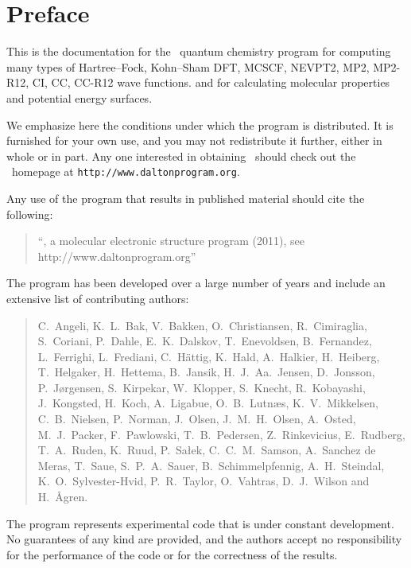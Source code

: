 \tableofcontents

\chapter*{Preface}

This is the documentation for the \dalton\ quantum chemistry program 
for computing many types of Hartree--Fock, Kohn--Sham DFT, 
MCSCF, NEVPT2, MP2, MP2-R12, CI, CC, CC-R12 wave functions.
and for calculating molecular properties and potential energy surfaces.

          We emphasize here the conditions under which the
program is distributed.  It is furnished for your own use,
and you may not redistribute it further, either in whole or in
part.  Any one interested in obtaining \dalton\ should check out the
\dalton\ homepage at
\verb|http://www.daltonprogram.org|.

Any use of the program that results in published
material should cite the following:
\begin{quote}
``\dalton , a molecular electronic  structure program
(2011), see http://www.daltonprogram.org''
\end{quote}

The program has been developed over a large number of years and
include an extensive list of contributing authors:

\begin{quote}\raggedright
C.~Angeli,
K.~L.~Bak,
V.~Bakken,
O.~Christiansen,
R.~Cimiraglia,
S.~Coriani,
P.~Dahle,
E.~K.~Dalskov,
T.~Enevoldsen,
B.~Fernandez,
L.~Ferrighi,
L.~Frediani,
C.~H{\"a}ttig,
K.~Hald,
A.~Halkier,
H.~Heiberg,
T.~Helgaker,
H.~Hettema,
B.~Jansik,
H.~J.~Aa.~Jensen,
D.~Jonsson,
P.~J{\o}rgensen,
S.~Kirpekar,
W.~Klopper,
S.~Knecht,
R.~Kobayashi,
J.~Kongsted,
H.~Koch,
A.~Ligabue,
O.~B.~Lutn\ae s,
K.~V.~Mikkelsen,
C.~B.~Nielsen,
P.~Norman,
J.~Olsen,
J.~M.~H.~Olsen,
A.~Osted,
M.~J.~Packer,
F.~Pawlowski,
T.~B.~Pedersen,
Z.~Rinkevicius,
E.~Rudberg,
T.~A.~Ruden,
K.~Ruud,
P.~Sa\l ek,
C.~C.~M.~Samson,
A.~Sanchez de Meras,
T.~Saue,
S.~P.~A.~Sauer,
B.~Schimmelpfennig,
A.~H.~Steindal,
K.~O.~Sylvester-Hvid,
P.~R.~Taylor,
O.~Vahtras,
D.~J.~Wilson
and H.~{\AA}gren.
\end{quote}

          The program represents experimental code that is
under constant development.  No guarantees of any kind are
provided, and the authors accept no responsibility for the
performance of the code or for the correctness of the results.
